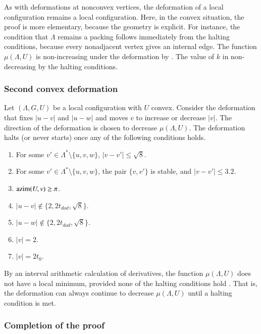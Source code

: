 \documentclass{article} %
\begin{document}
As with deformations at nonconvex vertices, 
the deformation of a local
configuration remains a local configuration.  Here, in the
convex situation, the proof is more elementary, because the
geometry is explicit.  For instance, the condition that
$\Lambda$ remains a packing follows immediately from the halting
conditions, because every nonadjacent vertex gives an internal
edge.
The function $\mu(\Lambda,U)$ is non-increasing under the
deformation by \cite[Lemma~7.8]{Hales:2002:Dodec}.  The value of
$k$ in non-decreasing by the halting conditions. 

\subsubsection{Second convex deformation}

Let $(\Lambda,G,U)$ be a local configuration with $U$ convex.
Consider the deformation that fixes $|u-v|$ and $|u-w|$ and
moves $v$ to increase or decrease $|v|$.  The direction
of the deformation is chosen to decrease $\mu(\Lambda,U)$.
The deformation halts (or never starts) once any
of the following conditions holds.
\begin{enumerate}\label{e:halt-convex2}
\item For some $v'\in\Lambda^*\setminus\{u,v,w\}$, 
 $|v-v'|\le \sqrt8$.
\item For some $v'\in\Lambda^*\setminus\{u,v,w\}$,
the pair $\{v,v'\}$ is  stable, and $|v-v'|\le 3.2$.
\item ${\operatorname{azim}}(U,v)\ge\pi$.
\item $|u-v|\not\in\{ 2,2t_{dod},\sqrt8\}$.
\item $|u-w|\not\in \{2,2t_{dod},\sqrt8\}$.
\item $|v|=2$.
\item $|v|=2t_0$.
\end{enumerate}

By an interval arithmetic calculation of derivatives,
the function $\mu(\Lambda,U)$ does not have a local
minimum, provided none of the halting conditions hold
\cite[Lemma~7.10]{Hales:2002:Dodec}.  That is, the deformation can always continue
to decrease $\mu(\Lambda,U)$ until a halting condition is met.

\subsubsection{Completion of the proof}
\end{document}
